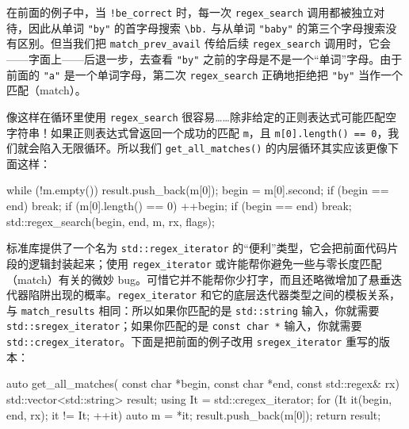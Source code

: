 在前面的例子中，当 \texttt{!be\_\allowbreak{}correct} 时，每一次 \texttt{regex\_\allowbreak{}search} 调用都被独立对待，因此从单词 \texttt{"by"} 的首字母搜索 \texttt{\textbackslash bb.} 与从单词 \texttt{"baby"} 的第三个字母搜索没有区别。但当我们把 \texttt{match\_\allowbreak{}prev\_\allowbreak{}avail} 传给后续 \texttt{regex\_\allowbreak{}search} 调用时，它会——字面上——后退一步，去查看 \texttt{"by"} 之前的字母是不是一个“单词”字母。由于前面的 \texttt{"a"} 是一个单词字母，第二次 \texttt{regex\_\allowbreak{}search} 正确地拒绝把 \texttt{"by"} 当作一个匹配（match）。

像这样在循环里使用 \texttt{regex\_\allowbreak{}search} 很容易……除非给定的正则表达式可能匹配空字符串！如果正则表达式曾返回一个成功的匹配 \texttt{m}，且 \texttt{m[0].length(\allowbreak{})\allowbreak{} == 0}，我们就会陷入无限循环。所以我们 \texttt{get\_\allowbreak{}all\_\allowbreak{}matches(\allowbreak{})\allowbreak{}} 的内层循环其实应该更像下面这样：

\begin{codebox}[cpp]
    while (!m.empty()) {
      result.push_back(m[0]);
      begin = m[0].second;
      if (begin == end) break;
      if (m[0].length() == 0) ++begin;
      if (begin == end) break;
      std::regex_search(begin, end, m, rx, flags);
    }
\end{codebox}

标准库提供了一个名为 \texttt{std::\allowbreak{}regex\_\allowbreak{}iterator} 的“便利”类型，它会把前面代码片段的逻辑封装起来；使用 \texttt{regex\_\allowbreak{}iterator} 或许能帮你避免一些与零长度匹配（match）有关的微妙 bug。可惜它并不能帮你少打字，而且还略微增加了悬垂迭代器陷阱出现的概率。\texttt{regex\_\allowbreak{}iterator} 和它的底层迭代器类型之间的模板关系，与 \texttt{match\_\allowbreak{}results} 相同：所以如果你匹配的是 \texttt{std::\allowbreak{}string} 输入，你就需要 \texttt{std::\allowbreak{}sregex\_\allowbreak{}iterator}；如果你匹配的是 \texttt{const char *} 输入，你就需要 \texttt{std::\allowbreak{}cregex\_\allowbreak{}iterator}。下面是把前面的例子改用 \texttt{sregex\_\allowbreak{}iterator} 重写的版本：

\begin{codebox}[cpp]
    auto get_all_matches(
      const char *begin, const char *end,
      const std::regex& rx)
    {
      std::vector<std::string> result;
      using It = std::cregex_iterator;
      for (It it(begin, end, rx); it != It{}; ++it) {
        auto m = *it;
        result.push_back(m[0]);
      }
      return result;
    }
\end{codebox}

